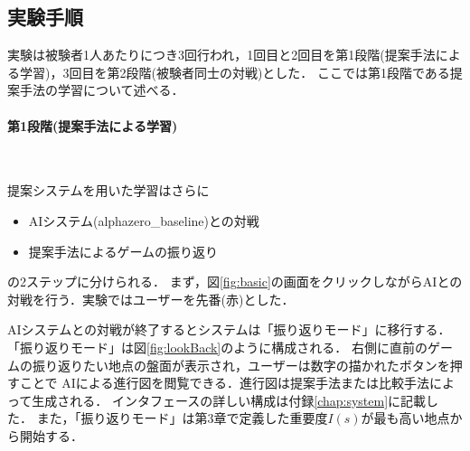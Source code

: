 \subsection{実験手順}
実験は被験者1人あたりにつき3回行われ，1回目と2回目を第1段階(提案手法による学習)，3回目を第2段階(被験者同士の対戦)とした．
ここでは第1段階である提案手法の学習について述べる．
\newpage
\paragraph{第1段階(提案手法による学習)}~
\par 提案システムを用いた学習はさらに
\begin{itemize}
	\item AIシステム(alphazero\_baseline)との対戦
	\item 提案手法によるゲームの振り返り
\end{itemize}
の2ステップに分けられる．
まず，図\ref{fig:basic}の画面をクリックしながらAIとの対戦を行う．実験ではユーザーを先番(赤)とした．


AIシステムとの対戦が終了するとシステムは「振り返りモード」に移行する．
「振り返りモード」は図\ref{fig:lookBack}のように構成される．
右側に直前のゲームの振り返りたい地点の盤面が表示され，ユーザーは数字の描かれたボタンを押すことで
AIによる進行図を閲覧できる．進行図は提案手法または比較手法によって生成される．
インタフェースの詳しい構成は付録\ref{chap:system}に記載した．
また，「振り返りモード」は第3章で定義した重要度$I(s)$が最も高い地点から開始する．

